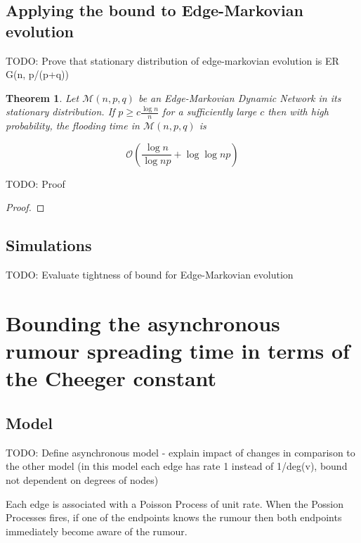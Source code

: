 \documentclass[a4paper,11pt]{article}
\newtheorem{theorem}{Theorem}[section]
\theoremstyle{definition}
\begin{document}
\subsection{Applying the bound to Edge-Markovian evolution}

TODO: Prove that stationary distribution of edge-markovian evolution is ER G(n, p/(p+q))

\begin{theorem}
	Let $\mathcal{M}(n, p, q)$ be an Edge-Markovian Dynamic Network in its stationary distribution. If $p \geq c \frac{\log n}{n}$ for a sufficiently large $c$ then with high probability, the flooding time in $\mathcal{M}(n, p, q)$ is 

	$$
		\mathcal{O}\left(\frac{\log n}{\log np} + \log \log np \right)
	$$
\end{theorem}

TODO: Proof

\begin{proof}
	
\end{proof}


\subsection{Simulations}

TODO: Evaluate tightness of bound for Edge-Markovian evolution

\section{Bounding the asynchronous rumour spreading time in terms of the Cheeger constant}
\label{AsyncCheegerBound}

\subsection{Model}

TODO: Define asynchronous model - explain impact of changes in comparison to the other model (in this model each edge has rate 1 instead of 1/deg(v), bound not dependent on degrees of nodes)


Each edge is associated with a Poisson Process of unit rate. When the Possion Processes fires, if one of the endpoints knows the rumour then both endpoints immediately become aware of the rumour. 
\end{document}

